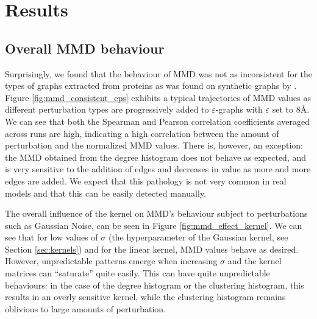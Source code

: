 \chapter{Results}

\section{Overall MMD behaviour}

Surprisingly, we found that the behaviour of MMD was not as inconsistent for the
types of graphs extracted from proteins as was found on synthetic graphs by
\cite{o2021evaluation}. Figure \ref{fig:mmd_consistent_eps} exhibits a typical
trajectories of MMD values as different perturbation types are progressively
added to $\varepsilon$-graphs with $\varepsilon$ set to $8$\si{\angstrom}. We
can see that both the Spearman and Pearson correlation coefficients averaged
across runs are high, indicating a high correlation between the amount of
perturbation and the normalized MMD values. There is, however, an exception: the
MMD obtained from the degree histogram does not behave as expected, and is very
sensitive to the addition of edges and decreases in value as more and more edges
are added. We expect that this pathology is not very common in real models and
that this can be easily detected manually.

The overall influence of the kernel on MMD's behaviour subject to perturbations
such as Gaussian Noise, can be seen in Figure \ref{fig:mmd_effect_kernel}. We
can see that for low values of $\sigma$ (the hyperparameter of the Gaussian
kernel, see Section \ref{sec:kernels}) and for the linear kernel, MMD values
behave as desired. However, unpredictable patterns emerge when increasing
$\sigma$ and the kernel matrices can ``saturate'' quite easily. This can have
quite unpredictable behaviours: in the case of the degree histogram or the
clustering histogram, this results in an overly sensitive kernel, while the
clustering histogram remains oblivious to large amounts of perturbation.

